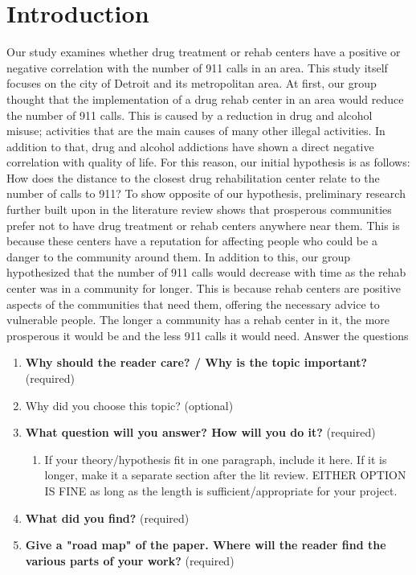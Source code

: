 \documentclass[12pt]{article}
\begin{document}
\section{Introduction} \label{sec:introduction}
    Our study examines whether drug treatment or rehab centers have a positive or negative correlation with the number of 911 calls in an area. This study itself focuses on the city of Detroit and its metropolitan area. At first, our group thought that the implementation of a drug rehab center in an area would reduce the number of 911 calls. This is caused by a reduction in drug and alcohol misuse; activities that are the main causes of many other illegal activities. In addition to that, drug and alcohol addictions have shown a direct negative correlation with quality of life. For this reason, our initial hypothesis is as follows: How does the distance to the closest drug rehabilitation center relate to the number of calls to 911? To show opposite of our hypothesis, preliminary research further built upon in the literature review shows that prosperous communities prefer not to have drug treatment or rehab centers anywhere near them. This is because these centers have a reputation for affecting people who could be a danger to the community around them. In addition to this, our group hypothesized that the number of 911 calls would decrease with time as the rehab center was in a community for longer. This is because rehab centers are positive aspects of the communities that need them, offering the necessary advice to vulnerable people. The longer a community has a rehab center in it, the more prosperous it would be and the less 911 calls it would need. 
Answer the questions
\begin{enumerate}
    \item \textbf{Why should the reader care? / Why is the topic important?} (required)
    \item Why did you choose this topic? (optional)
    \item \textbf{What question will you answer? How will you do it?} (required)
        \begin{enumerate}
            \item If your theory/hypothesis fit in one paragraph, include it here. If it is longer, make it a separate section after the lit review. EITHER OPTION IS FINE as long as the length is sufficient/appropriate for your project.
        \end{enumerate}
    \item \textbf{What did you find?} (required)
    \item \textbf{Give a "road map" of the paper. Where will the reader find the various parts of your work?} (required)
\end{enumerate}
\end{document}
